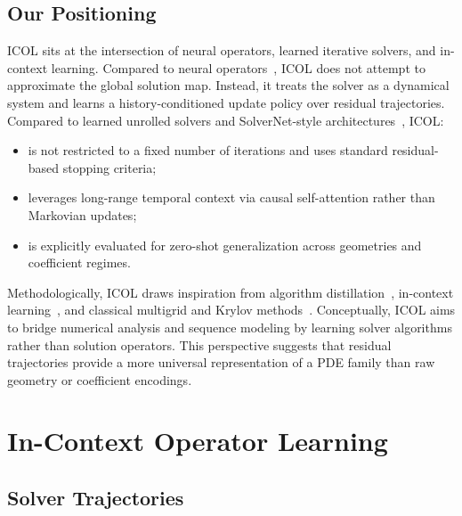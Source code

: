 \documentclass{article}
\begin{document}
\subsection{Our Positioning}

ICOL sits at the intersection of neural operators, learned iterative solvers, and in-context learning. Compared to neural operators~\cite{li2020fourier,lu2021deeponet,brandstetter2022message}, ICOL does not attempt to approximate the global solution map. Instead, it treats the solver as a dynamical system and learns a history-conditioned update policy over residual trajectories. Compared to learned unrolled solvers and SolverNet-style architectures~\cite{li2020neuralpde,wight2022solvernet,hoyer2023learning}, ICOL:
\begin{itemize}
\item is not restricted to a fixed number of iterations and uses standard residual-based stopping criteria;
\item leverages long-range temporal context via causal self-attention rather than Markovian updates;
\item is explicitly evaluated for zero-shot generalization across geometries and coefficient regimes.
\end{itemize}

Methodologically, ICOL draws inspiration from algorithm distillation~\cite{agarwal2023algorithmic}, in-context learning~\cite{vonOswald2023transformers,garg2022can}, and classical multigrid and Krylov methods~\cite{briggs2000multigrid,saad2003iterative,saad1986gmres}. Conceptually, ICOL aims to bridge numerical analysis and sequence modeling by learning solver algorithms rather than solution operators. This perspective suggests that residual trajectories provide a more universal representation of a PDE family than raw geometry or coefficient encodings.

\section{In-Context Operator Learning}

\subsection{Solver Trajectories}
\end{document}
